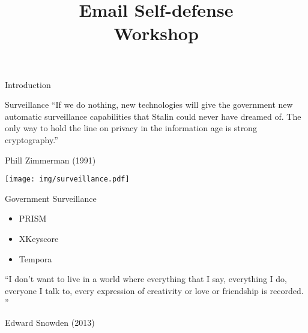 \documentclass{beamer}
\title{Email Self-defense \\ Workshop}
\institute{Free Software Foundation}
\begin{document}
\begin{frame}  
  \titlepage
\end{frame}


\begin{frame}{Introduction}

\end{frame}

\begin{frame}{Surveillance}
  \enquote{If we do nothing, new technologies will give the government new automatic surveillance capabilities that Stalin could never have dreamed of. The only way to hold the line on privacy in the information age is strong cryptography.}
  \begin{flushright}
    Phill Zimmerman (1991)
  \end{flushright}

  \begin{center}
    \texttt{[image: img/surveillance.pdf]}
  \end{center}

\end{frame}

\begin{frame}{Government Surveillance}

  \begin{itemize}
  \item PRISM
  \item XKeyscore
  \item Tempora
  \end{itemize}

  \enquote{I don't want to live in a world where everything that I say, everything I do, everyone I talk to, every expression of creativity or love or friendship is recorded. }
  \begin{flushright}
    Edward Snowden (2013)
  \end{flushright}
  
\end{frame}
\end{document}
